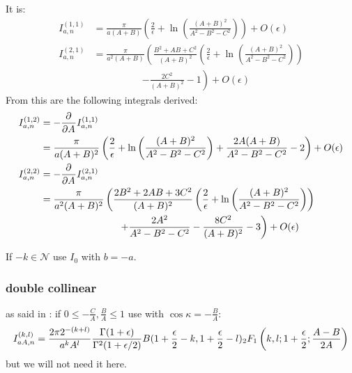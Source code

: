 It is\cite[Ch. 5]{Bojak:2000eu}:
\begin{align}
I_{a,n}^{(1,1)} &= \frac{\pi}{a(A+B)}\left(\frac 2 \epsilon + \ln\left(\frac{(A+B)^2}{A^2-B^2-C^2}\right) \right) + O(\epsilon) \\
I_{a,n}^{(2,1)} &= \frac{\pi}{a^2(A+B)}\left(\frac{B^2+AB+C^2}{(A+B)^2}\left(\frac 2 \epsilon + \ln\left(\frac{(A+B)^2}{A^2-B^2-C^2}\right)\right) \right.\nonumber\\
 &\hspace{60pt}\left. - \frac{2C^2}{(A+B)^2} - 1\right) + O(\epsilon)
\end{align}
From this are the following integrals derived\cite[Ch. 5]{Bojak:2000eu}:
\begin{align}
I_{a,n}^{(1,2)} &=-\frac {\partial^{}} {\partial A^{}} {I_{a,n}^{(1,1)}} \\
 &= \frac{\pi}{a(A+B)^2}\left(\frac 2 \epsilon + \ln\left(\frac{(A+B)^2}{A^2-B^2-C^2}\right) + \frac{2A(A+B)}{A^2-B^2-C^2} -2 \right) + O(\epsilon) \\
I_{a,n}^{(2,2)} &=-\frac {\partial^{}} {\partial A^{}} {I_{a,n}^{(2,1)}} \\
 &= \frac{\pi}{a^2(A+B)^2}\left(\frac{2B^2+2AB+3C^2}{(A+B)^2}\left(\frac 2 \epsilon + \ln\left(\frac{(A+B)^2}{A^2-B^2-C^2}\right)\right)\right.\nonumber\\
 &\hspace{80pt}\left. +\frac{2A^2}{A^2-B^2-C^2} - \frac{8C^2}{(A+B)^2} -3 \right) + O(\epsilon)
\end{align}

If $-k\in\mathcal N$ use $I_0$ with $b=-a$.

\subsubsection{double collinear}
as said in \cite[Ch. 5]{Bojak:2000eu}: if $0\leq -\frac{C}{A},\frac B A \leq 1$ use \cite[eq. A11]{van_neerven_dimensional_1986} with $\cos\kappa = -\frac B A$:
\begin{equation}
I_{aA,n}^{(k,l)} = \frac{2\pi 2^{-(k+l)}}{a^kA^l}\frac{\Gamma(1+\epsilon)}{\Gamma^2(1+\epsilon/2)} B(1+\frac \epsilon 2 - k, 1+ \frac \epsilon 2 -l) {}_{2}F_{1} \left(k,l;1+\frac \epsilon 2; \frac{A-B}{2A}\right)
\end{equation}
but we will not need it here.

